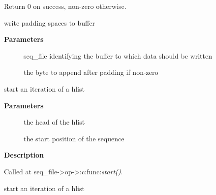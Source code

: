 \documentclass[a4paper,8pt,english]{sphinxmanual}
\begin{document}
Return 0 on success, non-zero otherwise.

\begin{fulllineitems}
\label{filesystems/index:c.seq_pad}
write padding spaces to buffer

\end{fulllineitems}


\textbf{Parameters}
\begin{description}
\item[{}] \leavevmode
seq\_file identifying the buffer to which data should be written

\item[{}] \leavevmode
the byte to append after padding if non-zero

\end{description}

\begin{fulllineitems}
\label{filesystems/index:c.seq_hlist_start}
start an iteration of a hlist

\end{fulllineitems}


\textbf{Parameters}
\begin{description}
\item[{}] \leavevmode
the head of the hlist

\item[{}] \leavevmode
the start position of the sequence

\end{description}

\textbf{Description}

Called at seq\_file-\textgreater{}op-\textgreater{}:c:func:\emph{start()}.

\begin{fulllineitems}
\label{filesystems/index:c.seq_hlist_start_head}
start an iteration of a hlist

\end{fulllineitems}
\end{document}
